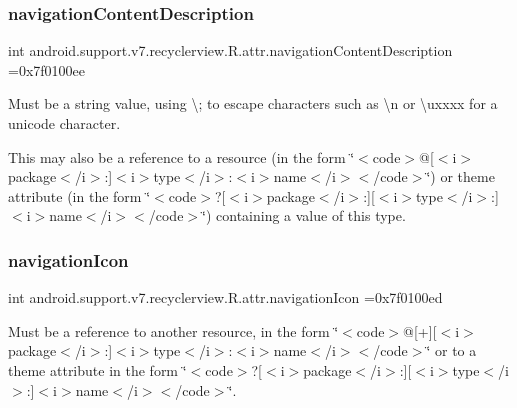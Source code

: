 \subsubsection{\texorpdfstring{navigation\+Content\+Description}{navigationContentDescription}}
{\footnotesize\ttfamily int android.\+support.\+v7.\+recyclerview.\+R.\+attr.\+navigation\+Content\+Description =0x7f0100ee\hspace{0.3cm}{\ttfamily [static]}}

Must be a string value, using \textquotesingle{}\textbackslash{};\textquotesingle{} to escape characters such as \textquotesingle{}\textbackslash{}n\textquotesingle{} or \textquotesingle{}\textbackslash{}uxxxx\textquotesingle{} for a unicode character. 

This may also be a reference to a resource (in the form \char`\"{}$<$code$>$@\mbox{[}$<$i$>$package$<$/i$>$\+:\mbox{]}$<$i$>$type$<$/i$>$\+:$<$i$>$name$<$/i$>$$<$/code$>$\char`\"{}) or theme attribute (in the form \char`\"{}$<$code$>$?\mbox{[}$<$i$>$package$<$/i$>$\+:\mbox{]}\mbox{[}$<$i$>$type$<$/i$>$\+:\mbox{]}$<$i$>$name$<$/i$>$$<$/code$>$\char`\"{}) containing a value of this type. \mbox{\label{classandroid_1_1support_1_1v7_1_1recyclerview_1_1R_1_1attr_a86dd81e542ac0cbd9366c0cae3d11360}} 
\subsubsection{\texorpdfstring{navigation\+Icon}{navigationIcon}}
{\footnotesize\ttfamily int android.\+support.\+v7.\+recyclerview.\+R.\+attr.\+navigation\+Icon =0x7f0100ed\hspace{0.3cm}{\ttfamily [static]}}

Must be a reference to another resource, in the form \char`\"{}$<$code$>$@\mbox{[}+\mbox{]}\mbox{[}$<$i$>$package$<$/i$>$\+:\mbox{]}$<$i$>$type$<$/i$>$\+:$<$i$>$name$<$/i$>$$<$/code$>$\char`\"{} or to a theme attribute in the form \char`\"{}$<$code$>$?\mbox{[}$<$i$>$package$<$/i$>$\+:\mbox{]}\mbox{[}$<$i$>$type$<$/i$>$\+:\mbox{]}$<$i$>$name$<$/i$>$$<$/code$>$\char`\"{}. \mbox{\label{classandroid_1_1support_1_1v7_1_1recyclerview_1_1R_1_1attr_a344a41483c3675f6ce55b22dc11e55b5}} 
